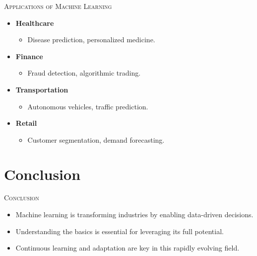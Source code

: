 \documentclass[compress]{beamer}
\begin{document}
\begin{frame}{\textsc{Applications of Machine Learning}}
  \begin{itemize}
    \item \textbf{Healthcare}
    \begin{itemize}
      \item Disease prediction, personalized medicine.
    \end{itemize}
    \item \textbf{Finance}
    \begin{itemize}
      \item Fraud detection, algorithmic trading.
    \end{itemize}
    \item \textbf{Transportation}
    \begin{itemize}
      \item Autonomous vehicles, traffic prediction.
    \end{itemize}
    \item \textbf{Retail}
    \begin{itemize}
      \item Customer segmentation, demand forecasting.
    \end{itemize}
  \end{itemize}
\end{frame}

\section{Conclusion}

\begin{frame}{\textsc{Conclusion}}
  \begin{itemize}
    \item Machine learning is transforming industries by enabling data-driven decisions.
    \item Understanding the basics is essential for leveraging its full potential.
    \item Continuous learning and adaptation are key in this rapidly evolving field.
  \end{itemize}
\end{frame}

\end{document}
